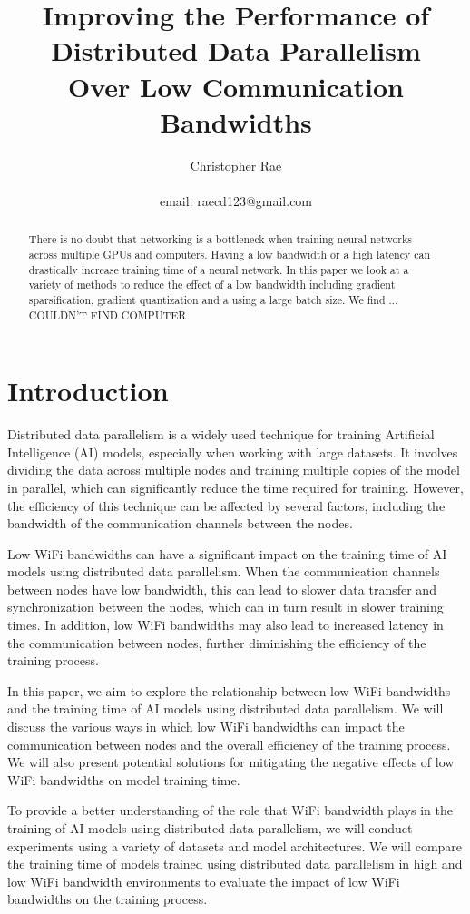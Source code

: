 \documentclass[11pt]{article}
\title{Improving the Performance of Distributed Data Parallelism \\Over Low Communication  Bandwidths}
\author{Christopher Rae \\ \begin{small} email: raecd123@gmail.com \end{small}}
\date{}
\begin{document}
\maketitle


\begin{abstract}
There is no doubt that networking is a bottleneck when training neural networks across multiple GPUs and computers. Having a low bandwidth or a high latency can drastically increase training time of a neural network. In this paper we look at a variety of methods to reduce the effect of a low bandwidth including gradient sparsification, gradient quantization and a using a large batch size. We find ... COULDN'T FIND COMPUTER
\end{abstract}
\tableofcontents
\newpage

\section{Introduction}
Distributed data parallelism is a widely used technique for training Artificial Intelligence (AI) models, especially when working with large datasets. It involves dividing the data across multiple nodes and training multiple copies of the model in parallel, which can significantly reduce the time required for training. However, the efficiency of this technique can be affected by several factors, including the bandwidth of the communication channels between the nodes.

Low WiFi bandwidths can have a significant impact on the training time of AI models using distributed data parallelism. When the communication channels between nodes have low bandwidth, this can lead to slower data transfer and synchronization between the nodes, which can in turn result in slower training times. In addition, low WiFi bandwidths may also lead to increased latency in the communication between nodes, further diminishing the efficiency of the training process.

In this paper, we aim to explore the relationship between low WiFi bandwidths and the training time of AI models using distributed data parallelism. We will discuss the various ways in which low WiFi bandwidths can impact the communication between nodes and the overall efficiency of the training process. We will also present potential solutions for mitigating the negative effects of low WiFi bandwidths on model training time.

To provide a better understanding of the role that WiFi bandwidth plays in the training of AI models using distributed data parallelism, we will conduct experiments using a variety of datasets and model architectures. We will compare the training time of models trained using distributed data parallelism in high and low WiFi bandwidth environments to evaluate the impact of low WiFi bandwidths on the training process.
\end{document}
